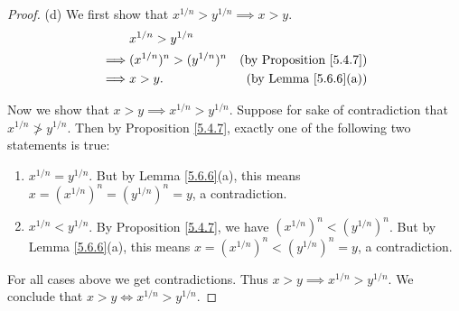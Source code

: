 \begin{proof}{(d)}
We first show that \(x^{1 / n} > y^{1 / n} \implies x > y\).
\begin{align*}
& x^{1 / n} > y^{1 / n} \\
\implies & (x^{1 / n})^n > (y^{1 / n})^n & \text{(by Proposition \ref{5.4.7})} \\
\implies & x > y. & \text{(by Lemma \ref{5.6.6}(a))}
\end{align*}

Now we show that \(x > y \implies x^{1 / n} > y^{1 / n}\).
Suppose for sake of contradiction that \(x^{1 / n} \not> y^{1 / n}\).
Then by Proposition \ref{5.4.7}, exactly one of the following two statements is true:
\begin{enumerate}[label=(\Roman*)]
    \item \(x^{1 / n} = y^{1 / n}\).
    But by Lemma \ref{5.6.6}(a), this means \(x = (x^{1 / n})^n = (y^{1 / n})^n = y\), a contradiction.
    \item \(x^{1 / n} < y^{1 / n}\).
    By Proposition \ref{5.4.7}, we have \((x^{1 / n})^n < (y^{1 / n})^n \).
    But by Lemma \ref{5.6.6}(a), this means \(x = (x^{1 / n})^n < (y^{1 / n})^n = y\), a contradiction.
\end{enumerate}
For all cases above we get contradictions.
Thus \(x > y \implies x^{1 / n} > y^{1 / n}\).
We conclude that \(x > y \iff x^{1 / n} > y^{1 / n}\).
\end{proof}


